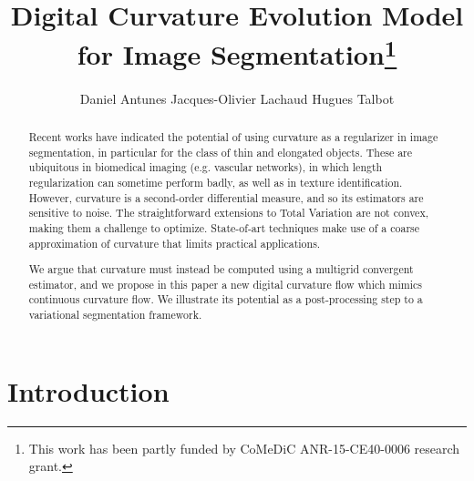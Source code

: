 \documentclass[runningheads]{llncs}
\begin{document}
%
\title{Digital Curvature Evolution Model for Image Segmentation\thanks{This  work has  been  partly  funded by CoMeDiC ANR-15-CE40-0006 research grant.}}

\author{Daniel Antunes
Jacques-Olivier Lachaud
Hugues Talbot}
%
%
%
\maketitle              %
%
\begin{abstract}
  Recent works have indicated the potential of using curvature as a
  regularizer in image segmentation, in particular for the class of
  thin and elongated objects. These are ubiquitous in biomedical
  imaging (e.g. vascular networks), in which length regularization can
  sometime perform badly, as well as in texture
  identification. However, curvature is a second-order differential measure,
  and so its estimators are sensitive to noise. The straightforward
  extensions to Total Variation are not convex, making them a challenge
  to optimize.  State-of-art techniques make use of a coarse
  approximation of curvature that limits practical applications.

  We argue that curvature must instead be computed using a multigrid
  convergent estimator, and we propose in this paper a new digital
  curvature flow which mimics continuous curvature flow. We
  illustrate its potential as a post-processing step to a variational
  segmentation framework.
 
\end{abstract}
%
%
%
\setcounter{footnote}{0}
\section{Introduction}
\end{document}
